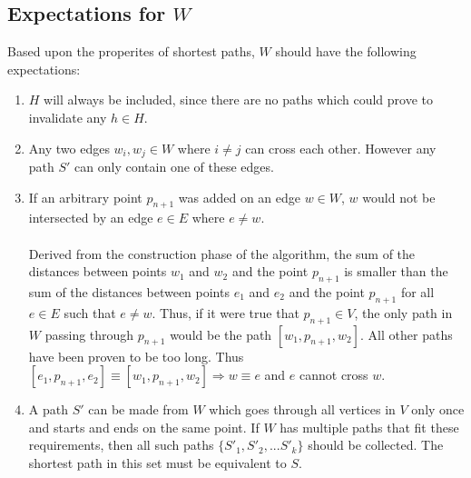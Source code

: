 \documentclass[12pt]{article}
\begin{document}
\subsection{Expectations for $W$}\label{subsec:exp_w}
Based upon the properites of shortest paths, $W$ should have the following expectations:
\begin{enumerate}
\item $H$ will always be included, since there are no paths which could prove to
invalidate any $h \in H$.
\item Any two edges $w_i,w_j \in W$ where $i \neq j$ can cross each other.
However any path $S'$ can only contain one of these edges.
\item If an arbitrary point $p_{n+1}$ was added on an edge $w \in W$,
$w$ would not be intersected by an edge $e \in E$ where $e \neq w$.
\\\\
Derived from the construction phase of the algorithm,
the sum of the distances between points
$w_1$ and $w_2$ and the point $p_{n+1}$
is smaller than the sum of the distances between points
$e_1$ and $e_2$ and the point $p_{n+1}$ for all $e \in E$ such that $e \neq w$.
Thus, if it were true that $p_{n+1} \in V$, the only path in $W$ passing
through $p_{n + 1}$ would be the path $[w_1,p_{n+1},w_2]$.
All other paths have been proven to be too long.
Thus $[e_1,p_{n+1},e_2] \equiv [w_1,p_{n+1},w_2] \Rightarrow w \equiv e$
and $e$ cannot cross $w$.
\item A path $S'$ can be made from $W$ which goes through all vertices in $V$ only once
and starts and ends on the same point.
If $W$ has multiple paths that fit these requirements, then all such paths
$\{S'_1, S'_2, ... S'_k\}$ should be collected.
The shortest path in this set must be equivalent to $S$.
\end{enumerate}
\end{document}
